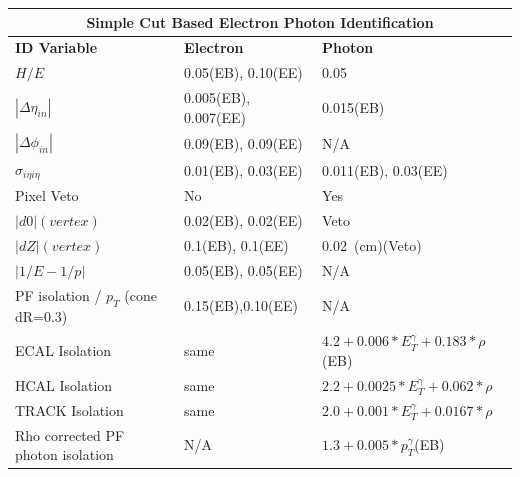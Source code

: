 \begin{center}
\centering
\begin{tabular}{l|l|p{3.2cm}} %
 
  \multicolumn{3}{c}{\bfseries{Simple Cut Based Electron Photon Identification}} \\
  \toprule
  \bfseries{ID Variable} & \bfseries{Electron} & \bfseries{Photon} \\
   \hline \hline 
  $H/E$ & 0.05(EB), 0.10(EE)  & 0.05 \\
  \hline
  $|\Delta \eta_{in}|$ & 0.005(EB), 0.007(EE)  & 0.015(EB)  \\
  \hline
   $|\Delta \phi_{in}|$ & 0.09(EB), 0.09(EE)  & N/A \\ \hline
   $\sigma_{i\eta i\eta}$ & 0.01(EB), 0.03(EE) & 0.011(EB), 0.03(EE)  \\
   \hline
   Pixel Veto & No & Yes \\
   \hline
   $|d0|(vertex)$ & 0.02(EB), 0.02(EE) &  Veto \\
   \hline
    $|dZ|(vertex)$ & 0.1(EB), 0.1(EE) & 0.02~(cm)(Veto) \\
    \hline
     $|1/E - 1/p|$ & 0.05(EB), 0.05(EE) & N/A \\
     \hline
     PF isolation / $p_{T}$ (cone dR=0.3) & 0.15(EB),0.10(EE) &  N/A \\
     \hline
     ECAL Isolation & same  & $4.2 + 0.006*E^{\gamma}_{T} + 0.183*\rho$(EB) \\
     \hline
     HCAL Isolation & same & $2.2 + 0.0025*E^{\gamma}_{T} + 0.062*\rho$ \\
     \hline
     TRACK Isolation & same  & $2.0 + 0.001*E^{\gamma}_{T} + 0.0167*\rho$ \\
     \hline
     Rho corrected PF photon isolation & N/A & $1.3 + 0.005*p^{\gamma}_{T}$(EB) \\     
     
   \hline
   \bottomrule
  \end{tabular}
 \label{tab:EgammaID} %
 \end{center}



